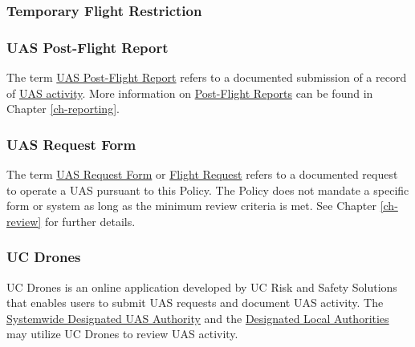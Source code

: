 \documentclass[
]{book}
\begin{document}
\hypertarget{TFR}{%
\subsubsection*{Temporary Flight Restriction}\label{TFR}}







\hypertarget{postflight}{%
\subsubsection*{UAS Post-Flight Report}\label{postflight}}

The term \protect\hyperlink{postflight}{UAS Post-Flight Report} refers to a documented submission of a record of \protect\hyperlink{UASactivity}{UAS activity}. More information on \protect\hyperlink{postflight}{Post-Flight Reports} can be found in Chapter \ref{ch-reporting}.







\hypertarget{FR}{%
\subsubsection*{UAS Request Form}\label{FR}}

The term \protect\hyperlink{FR}{UAS Request Form} or \protect\hyperlink{FR}{Flight Request} refers to a documented request to operate a UAS pursuant to this Policy. The Policy does not mandate a specific form or system as long as the minimum review criteria is met. See Chapter \ref{ch-review} for further details.





\hypertarget{UCDrones}{%
\subsubsection*{UC Drones}\label{UCDrones}}

UC Drones is an online application developed by UC Risk and Safety Solutions that enables users to submit UAS requests and document UAS activity. The \protect\hyperlink{SDA}{Systemwide Designated UAS Authority} and the \protect\hyperlink{DLA}{Designated Local Authorities} may utilize UC Drones to review UAS activity.
\end{document}
